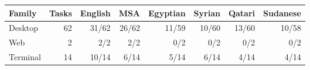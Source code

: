 \begin{tabular}{lrrrrrrr}
\toprule
Family & Tasks & English & MSA & Egyptian & Syrian & Qatari & Sudanese \\
\midrule
Desktop & 62 & 31/62 & 26/62 & 11/59 & 10/60 & 13/60 & 10/58 \\
Web & 2 & 2/2 & 2/2 & 0/2 & 0/2 & 0/2 & 0/2 \\
Terminal & 14 & 10/14 & 6/14 & 5/14 & 6/14 & 4/14 & 4/14 \\
\bottomrule
\end{tabular}
